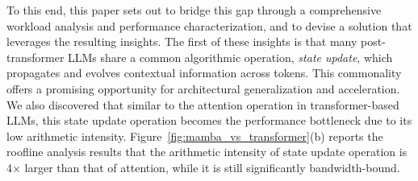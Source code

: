 %
To this end, this paper sets out to bridge this gap through a
comprehensive workload analysis and performance characterization, and
to devise a solution that leverages the resulting insights.
%
The first of these insights is that many post-transformer LLMs share a
common algorithmic operation, \emph{state update}, which propagates
and evolves contextual information across tokens.
%
This commonality offers a promising opportunity for architectural
generalization and acceleration.
%
We also discovered that similar to the attention operation in
transformer-based LLMs, this state update operation becomes the
performance bottleneck due to its low arithmetic intensity.
%
Figure~\ref{fig:mamba_vs_transformer}(b) reports the roofline
analysis results that the arithmetic intensity of state update
operation is 4$\times$ larger than that of attention, while it is
still significantly bandwidth-bound.
%


